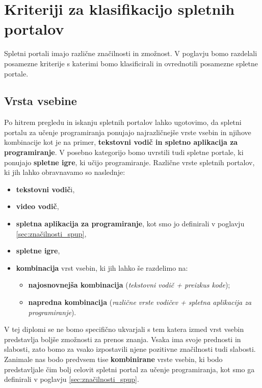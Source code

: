 \section{Kriteriji za klasifikacijo spletnih portalov}
\label{sec:kriteriji_za_klasifikacijo_spletnih_portalov}

Spletni portali imajo različne značilnosti in zmožnost. V poglavju
bomo razdelali posamezne kriterije s katerimi bomo klasificirali in
ovrednotili posamezne spletne portale.

\subsection{Vrsta vsebine}
\label{sec:Razvrstitev_spletnih_portalov}

Po hitrem pregledu in iskanju spletnih portalov lahko ugotovimo, da
spletni portalu za učenje programiranja ponujajo najrazličnejše vrste
vsebin in njihove kombinacije kot je na primer, \textbf{tekstovni
  vodič in spletno aplikacija za programiranje}. V posebno kategorijo
bomo uvrstili tudi spletne portale, ki ponujajo \textbf{spletne igre},
ki učijo programiranje. Različne vrste spletnih portalov, ki jih lahko
obravnavamo so naslednje:

\begin{itemize}
\tightlist
\item \textbf{tekstovni vodič}i,
\item \textbf{video vodič},

\item \textbf{spletna aplikacija za programiranje}, kot smo jo
  definirali v poglavju \ref{sec:značilnosti_spup},
\item \textbf{spletne igre},
\item \textbf{kombinacija} vrst vsebin, ki jih lahko še razdelimo na:
  \begin{itemize}
    \tightlist
  \item \textbf{najosnovnejša kombinacija} (\emph{tekstovni vodič + preizkus kode});
  \item \textbf{napredna kombinacija} (\emph{različne vrste vodičev +
      spletna aplikacija za programiranje}).
  \end{itemize}
\end{itemize}

V tej diplomi se ne bomo specifično ukvarjali s tem katera izmed vrst
vsebin predstavlja boljše zmožnosti za prenos znanja. Vsaka ima svoje
prednosti in slabosti, zato bomo za vsako izpostavili njene pozitivne
značilnosti tudi slabosti. Zanimale nas bodo predvsem tise
\textbf{kombinirane} vrste vsebin, ki bodo predstavljale čim bolj
celovit spletni portal za učenje programiranja, kot smo ga definirali
v poglavju \ref{sec:značilnosti_spup}.

